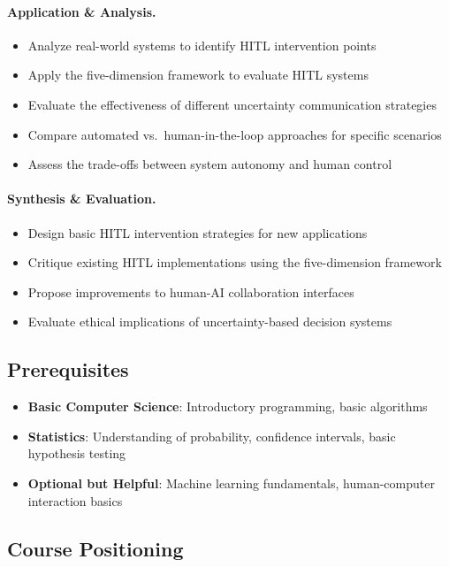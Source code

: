 \paragraph{Application \& Analysis.}
\begin{itemize}
    \item Analyze real-world systems to identify HITL intervention points
    \item Apply the five-dimension framework to evaluate HITL systems
    \item Evaluate the effectiveness of different uncertainty communication strategies
    \item Compare automated vs.\ human-in-the-loop approaches for specific scenarios
    \item Assess the trade-offs between system autonomy and human control
\end{itemize}

\paragraph{Synthesis \& Evaluation.}
\begin{itemize}
    \item Design basic HITL intervention strategies for new applications
    \item Critique existing HITL implementations using the five-dimension framework
    \item Propose improvements to human-AI collaboration interfaces
    \item Evaluate ethical implications of uncertainty-based decision systems
\end{itemize}

\subsection{Prerequisites}
\begin{itemize}
    \item \textbf{Basic Computer Science}: Introductory programming, basic algorithms
    \item \textbf{Statistics}: Understanding of probability, confidence intervals, basic hypothesis testing
    \item \textbf{Optional but Helpful}: Machine learning fundamentals, human-computer interaction basics
\end{itemize}

\subsection{Course Positioning}

